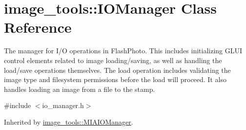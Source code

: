 \hypertarget{classimage__tools_1_1IOManager}{}\section{image\+\_\+tools\+:\+:I\+O\+Manager Class Reference}
\label{classimage__tools_1_1IOManager}


The manager for I/O operations in Flash\+Photo. This includes initializing G\+L\+UI control elements related to image loading/saving, as well as handling the load/save operations themselves. The load operation includes validating the image type and filesystem permissions before the load will proceed. It also handles loading an image from a file to the stamp.  




{\ttfamily \#include $<$io\+\_\+manager.\+h$>$}



Inherited by \hyperlink{classimage__tools_1_1MIAIOManager}{image\+\_\+tools\+::\+M\+I\+A\+I\+O\+Manager}.

